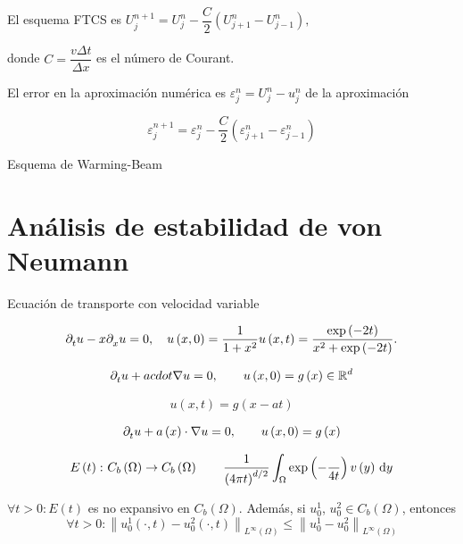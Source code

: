 El esquema FTCS es
\begin{math}
	U^{n+1}_{j}=
	U^{n}_{j}-
	\dfrac{C}{2}
	\left(U^{n}_{j+1}-U^{n}_{j-1}\right),
\end{math}

donde $C=\dfrac{v\Delta t}{\Delta x}$ es el número de Courant.

El error en la aproximación numérica es $\varepsilon^{n}_{j}=U^{n}_{j}-u^{n}_{j}$ de la aproximación

\begin{equation*}
	\varepsilon^{n+1}_{j}=
	\varepsilon^{n}_{j}-
	\dfrac{C}{2}
	\left(\varepsilon^{n}_{j+1}-\varepsilon^{n}_{j-1}\right)
\end{equation*}

Esquema de Warming-Beam

\section*{Análisis de estabilidad de von Neumann}


Ecuación de transporte con velocidad variable

\begin{equation*}
	\difcp{u}{t}-
	x\difcp{u}{x}=0,\quad
	u\left(x,0\right)=
	\dfrac{1}{1+x^{2}}
	u\left(x,t\right)=
	\dfrac{\exp\left(-2t\right)}{x^{2}+\exp\left(-2t\right)}.
\end{equation*}

\begin{equation*}
	\difcp{u}{t}+
	a
	cdot
	\nabla u=0,\qquad
	u\left(x,0\right)=g\left(x\right)\in\mathbb{R}^{d}
\end{equation*}

\begin{equation*}
	u\left(x,t\right)=
	g\left(x-at\right)
\end{equation*}

\begin{equation*}
	\difcp{u}{t}+
	a\left(x\right)\cdot
	\nabla u=0,\qquad
	u\left(x,0\right)=
	g\left(x\right)
\end{equation*}

\begin{equation*}
	E\left(t\right)\colon C_{b}\left(\Omega\right)\to C_{b}\left(\Omega\right)\qquad
	\dfrac{1}{{\left(4\pi t\right)}^{d/2}}
	\int_{\Omega}
	\exp\left(-\dfrac{}{4t}\right)
	v\left(y\right)
	\dl y
\end{equation*}

\begin{theorem}[No expansividad]
	\begin{math}
		\forall t>0:
		E\left(t\right)
	\end{math}
	es no expansivo en $C_{b}\left(\Omega\right)$.
	Además, si $u^{1}_{0}$, $u^{2}_{0}\in C_{b}\left(\Omega\right)$, entonces
	\begin{equation*}
		\forall t>0:
		{\left\|
		u^{1}_{0}\left(\cdot, t\right)-u^{2}_{0}\left(\cdot, t\right)
		\right\|}_{L^{\infty}\left(\Omega\right)}\leq
		{\left\|
		u^{1}_{0}-u^{2}_{0}
		\right\|}_{L^{\infty}\left(\Omega\right)}
	\end{equation*}
\end{theorem}


